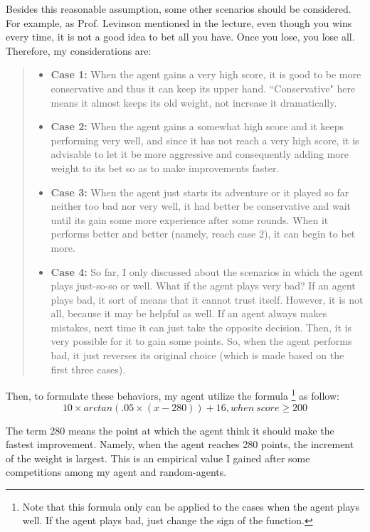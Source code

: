 \documentclass[10pt]{article}
\begin{document}
Besides this reasonable assumption, some other scenarios should be considered. For example, as Prof. Levinson mentioned in the lecture, even though you wins every time, it is not a good idea to bet all you have. Once you lose, you lose all. Therefore, my considerations are:
\begin{quote}
\begin{itemize}
\item \textbf{Case 1:} When the agent gains a very high score, it is good to be more conservative and thus it can keep its upper hand. ``Conservative" here means it almost keeps its old weight, not increase it dramatically.
\item \textbf{Case 2:} When the agent gains a somewhat high score and it keeps performing very well, and since it has not reach a very high score, it is advisable to let it be more aggressive and consequently adding more weight to its bet so as to make improvements faster.
\item \textbf{Case 3:} When the agent just starts its adventure or it played so far neither too bad nor very well, it had better be conservative and wait until its gain some more experience after some rounds. When it performs better and better (namely, reach case 2), it can begin to bet more.
\item \textbf{Case 4:} So far, I only discussed about the scenarios in which the agent plays just-so-so or well. What if the agent plays very bad? If an agent plays bad, it sort of means that it cannot trust itself. However, it is not all, because it may be helpful as well. If an agent always makes mistakes, next time it can just take the opposite decision. Then, it is very possible for it to gain some points. So, when the agent performs bad, it just reverses its original choice (which is made based on the first three cases).
\end{itemize}
\end{quote}

Then, to formulate these behaviors, my agent utilize the formula \footnote{Note that this formula only can be applied to the cases when the agent plays well. If the agent plays bad, just change the sign of the function.} as follow:
$$
10\times arctan(.05\times (x - 280)) + 16, when\ score\geq 200
$$

The term 280 means the point at which the agent think it should make the fastest improvement. Namely, when the agent reaches 280 points, the increment of the weight is largest. This is an empirical value I gained after some competitions among my agent and random-agents.
\end{document}
